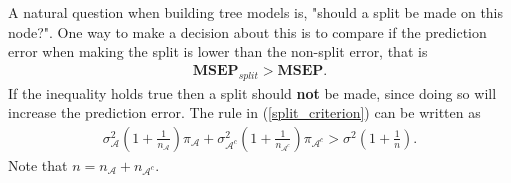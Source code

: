 \documentclass{article}
\theoremstyle{definition}
\theoremstyle{remark}
\begin{document}
A natural question when building tree models is, "should a split be made on this
node?". One way to make a decision about this is to compare if the prediction
error when making the split is lower than the non-split error, that is
\begin{align}
	\textbf{MSEP}_{split} > \textbf{MSEP}.
	\label{split_criterion}
\end{align}
If the inequality holds true then a split should \textbf{not} be made, since
doing so will increase the prediction error. The rule in (\ref{split_criterion})
can be written as
\begin{align}\label{eq:Stop}
	\sigma^2_{\mathcal{A}}( 1 + \frac{1}{n_{\mathcal{A}} })\pi_{\mathcal{A}} +
	\sigma^2_{\mathcal{A}^c}(1 + \frac{1}{n_{\mathcal{A}^c}})\pi_{\mathcal{A}^c} >
	\sigma^2(1 + \frac{1}{n}).
\end{align}
Note that $ n = n_{\mathcal{A}} + n_{\mathcal{A}^c} $.
\end{document}
